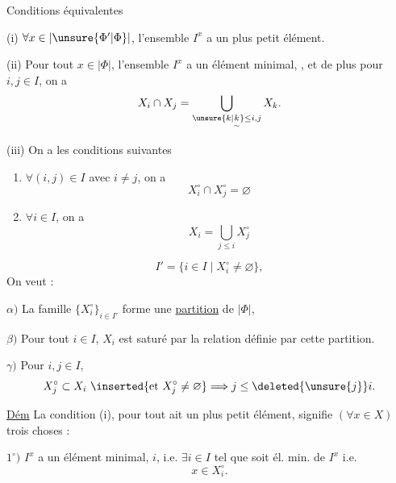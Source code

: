 Conditions équivalentes

(i) $\forall x\in|\unsure{\Phi'|\Phi}|$, l'ensemble $I^x$ a un plus petit élément.

(ii) Pour tout $x\in|\Phi|$, l'ensemble $I^x$ a un élément minimal, , et de plus pour $i,j\in I$, on a
\[
X_i\cap X_j=\bigcup_{\unsure{k|\underset{\sim}{k}}\leq i,j}X_k.
\]

(iii) On a les conditions suivantes

\begin{enumerate}[label=\alph*)]
\item $\forall(i,j)\in I$ avec $i\ne j$, on a
\[
X_i^{\circ}\cap X_j^{\circ}=\varnothing
\]
\item {} $\forall i\in I$, on a
\[
X_i=\bigcup_{j\leq i}X_j^{\circ}
\]
\end{enumerate}

\[
I'=\{i\in I\mid X_i^{\circ}\ne\varnothing\},
\]
 On veut :

$\alpha)$ La famille $\{X_i^{\circ}\}_{i\in I'}$ forme une \uline{partition} de $|\Phi|$, 

$\beta)$ Pour tout $i\in I$, $X_i$ est saturé par la relation   définie par cette partition.

$\gamma)$ Pour $i,j\in I$, 
\[
X_j^{\circ}\subset X_i\ \inserted{\text{et }X_j^{\circ}\ne\varnothing}\Longrightarrow j\leq\deleted{\unsure{j}}i.
\]

\uline{Dém} La condition (i),  pour tout   ait un plus petit élément, signifie  $(\forall x\in X)$ trois choses :

$1^{\circ})$ $I^x$  a un élément minimal, $i$, i.e. $\exists i\in I$ tel que  soit él. min. de $I^x$ i.e.
\[
x\in X_i^{\circ}.
\]

